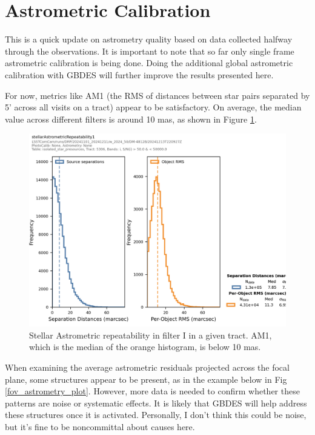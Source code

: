 \section{Astrometric Calibration}
\label{sec:astrometric_calibration}


This is a quick update on astrometry quality based on data collected halfway through the \ComCam observations. It is important to note that so far only single frame astrometric calibration is being done. Doing the additional global astrometric calibration with GBDES will further improve the results presented here.


For now, metrics like AM1 (the RMS of distances between star pairs separated by 5’ across all visits on a tract) appear to be satisfactory. On average, the median value across different filters is around 10 mas, as shown in Figure \ref{AM1_plot}.

\begin{figure}
        \centering
        \includegraphics[scale=0.47]{figures/astrometry-f01-repeatability}
        \caption{\small Stellar Astrometric repeatability in filter I in a given tract. AM1, which is the median of the orange histogram,  is below 10 mas.}
        \label{AM1_plot}
\end{figure}

When examining the average astrometric residuals projected across the focal plane, some structures appear to be present, as in the example below in Fig \ref{fov_astrometry_plot}. However, more data is needed to confirm whether these patterns are noise or systematic effects. It is likely that GBDES will help address these structures once it is activated. Personally, I don’t think this could be noise, but it’s fine to be noncommittal about causes here.

